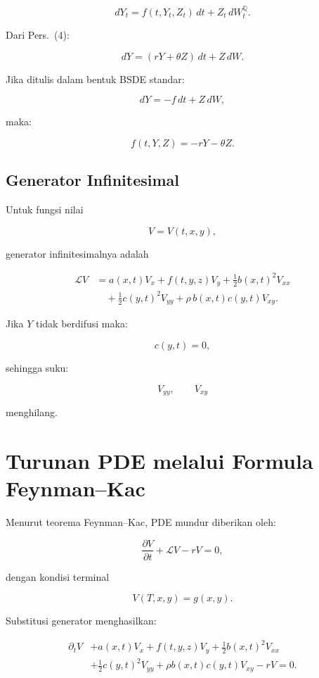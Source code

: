 \documentclass[12pt,a4paper]{article}
\begin{document}
\begin{equation}
dY_t
=
f(t,Y_t,Z_t)\,dt
+
Z_t\,dW_t^{\mathbb Q}.
\end{equation}

Dari Pers.~(4):

\[
dY=(rY+\theta Z)\,dt+Z\,dW.
\]

Jika ditulis dalam bentuk BSDE standar:

\[
dY=-f\,dt+Z\,dW,
\]

maka:

\[
f(t,Y,Z)
=
-rY-\theta Z.
\]

\subsection*{Generator Infinitesimal}

Untuk fungsi nilai

\[
V=V(t,x,y),
\]

generator infinitesimalnya adalah

\begin{align}
\mathcal LV
&=
a(x,t)V_x
+
f(t,y,z)V_y
+
\frac12 b(x,t)^2V_{xx}
\nonumber\\
&\quad+
\frac12 c(y,t)^2V_{yy}
+
\rho\,b(x,t)c(y,t)V_{xy}.
\end{align}

Jika $Y$ tidak berdifusi maka:

\[
c(y,t)=0,
\]

sehingga suku:

\[
V_{yy},
\qquad
V_{xy}
\]

menghilang.

\section{Turunan PDE melalui Formula Feynman--Kac}

Menurut teorema Feynman--Kac, PDE mundur diberikan oleh:

\begin{equation}
\frac{\partial V}{\partial t}
+
\mathcal LV
-rV
=
0,
\end{equation}

dengan kondisi terminal

\[
V(T,x,y)=g(x,y).
\]

Substitusi generator menghasilkan:

\begin{align}
\partial_tV
&+
a(x,t)V_x
+
f(t,y,z)V_y
+
\frac12 b(x,t)^2V_{xx}
\nonumber\\
&+
\frac12 c(y,t)^2V_{yy}
+
\rho b(x,t)c(y,t)V_{xy}
-rV
=
0.
\end{align}
\end{document}
